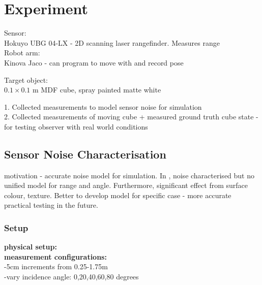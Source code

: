 \chapter{Experiment}
Sensor:\\
Hokuyo UBG 04-LX - 2D scanning laser rangefinder. Measures range\\

Robot arm: \\
Kinova Jaco - can program to move with and record pose

Target object: \\
$0.1 \times 0.1$ m MDF cube, spray painted matte white

1. Collected measurements to model sensor noise for simulation\\
2. Collected measurements of moving cube + measured ground truth cube state - for testing observer with real world conditions

\section{Sensor Noise Characterisation} \label{sensor_noise}
motivation - accurate noise model for simulation. In \cite{park2010characterization}, noise characterised but no unified model for range and angle. Furthermore, significant effect from surface colour, texture. Better to develop model for specific case - more accurate practical testing in the future.

	\subsection{Setup}
		\textbf{physical setup:}\\
		\textbf{measurement configurations:}\\
			-5cm increments from 0.25-1.75m\\
			-vary incidence angle: 0,20,40,60,80 degrees
		 
